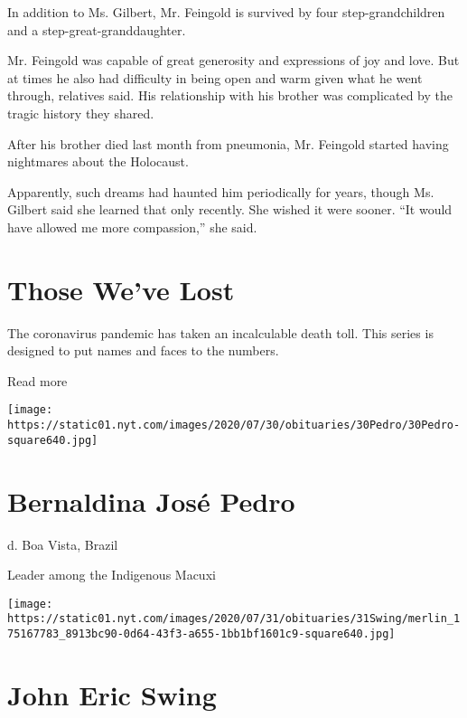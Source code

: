 In addition to Ms. Gilbert, Mr. Feingold is survived by four
step-grandchildren and a step-great-granddaughter.

Mr. Feingold was capable of great generosity and expressions of joy and
love. But at times he also had difficulty in being open and warm given
what he went through, relatives said. His relationship with his brother
was complicated by the tragic history they shared.

After his brother died last month from pneumonia, Mr. Feingold started
having nightmares about the Holocaust.

Apparently, such dreams had haunted him periodically for years, though
Ms. Gilbert said she learned that only recently. She wished it were
sooner. ``It would have allowed me more compassion,'' she said.

\href{https://www.nytimes.com/interactive/2020/obituaries/people-died-coronavirus-obituaries.html?action=click\&pgtype=Article\&state=default\&region=BELOW_MAIN_CONTENT\&context=covid_obits_promo}{}

\hypertarget{those-weve-lost}{%
\section{Those We've Lost}\label{those-weve-lost}}

The coronavirus pandemic has taken an incalculable death toll. This
series is designed to put names and faces to the numbers.

Read more

\texttt{[image: https://static01.nyt.com/images/2020/07/30/obituaries/30Pedro/30Pedro-square640.jpg]}

\hypertarget{bernaldina-josuxe9-pedro}{%
\section{Bernaldina José Pedro}\label{bernaldina-josuxe9-pedro}}

d. Boa Vista, Brazil

Leader among the Indigenous Macuxi

\texttt{[image: https://static01.nyt.com/images/2020/07/31/obituaries/31Swing/merlin\_175167783\_8913bc90-0d64-43f3-a655-1bb1bf1601c9-square640.jpg]}

\hypertarget{john-eric-swing}{%
\section{John Eric Swing}\label{john-eric-swing}}

